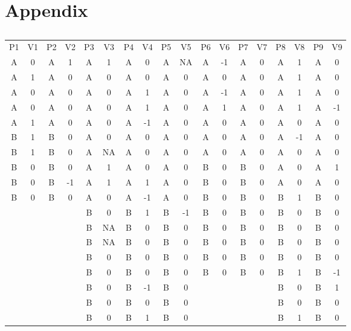 \documentclass{jote-article}
\begin{document}
\section{Appendix} 


  \begin{table}

  \label{Table 2}\caption{}
  \begin{tabular}{c  c  c  c  c  c  c  c  c  c  c  c  c  c  c  c  c  c}

  P1 & V1 & P2 & V2 & P3 & V3 & P4 & V4 & P5 & V5 & P6 & V6 & P7 & V7 & P8 & V8 & P9 & V9 & \\
A & 0 & A & 1 & A & 1 & A & 0 & A & NA & A & -1 & A & 0 & A & 1 & A & 0 & \\
A & 1 & A & 0 & A & 0 & A & 0 & A & 0 & A & 0 & A & 0 & A & 1 & A & 0 & \\
A & 0 & A & 0 & A & 0 & A & 1 & A & 0 & A & -1 & A & 0 & A & 1 & A & 0 & \\
A & 0 & A & 0 & A & 0 & A & 1 & A & 0 & A & 1 & A & 0 & A & 1 & A & -1 & \\
A & 1 & A & 0 & A & 0 & A & -1 & A & 0 & A & 0 & A & 0 & A & 0 & A & 0 & \\
B & 1 & B & 0 & A & 0 & A & 0 & A & 0 & A & 0 & A & 0 & A & -1 & A & 0 & \\
B & 1 & B & 0 & A & NA & A & 0 & A & 0 & A & 0 & A & 0 & A & 0 & A & 0 & \\
B & 0 & B & 0 & A & 1 & A & 0 & A & 0 & B & 0 & B & 0 & A & 0 & A & 1 & \\
B & 0 & B & -1 & A & 1 & A & 1 & A & 0 & B & 0 & B & 0 & A & 0 & A & 0 & \\
B & 0 & B & 0 & A & 0 & A & -1 & A & 0 & B & 0 & B & 0 & B & 1 & B & 0 & \\
 &  &  &  & B & 0 & B & 1 & B & -1 & B & 0 & B & 0 & B & 0 & B & 0 & \\
 &  &  &  & B & NA & B & 0 & B & 0 & B & 0 & B & 0 & B & 0 & B & 0 & \\
 &  &  &  & B & NA & B & 0 & B & 0 & B & 0 & B & 0 & B & 0 & B & 0 & \\
 &  &  &  & B & 0 & B & 0 & B & 0 & B & 0 & B & 0 & B & 0 & B & 0 & \\
 &  &  &  & B & 0 & B & 0 & B & 0 & B & 0 & B & 0 & B & 1 & B & -1 & \\
 &  &  &  & B & 0 & B & -1 & B & 0 &  &  &  &  & B & 0 & B & 1 & \\
 &  &  &  & B & 0 & B & 0 & B & 0 &  &  &  &  & B & 0 & B & 0 & \\
 &  &  &  & B & 0 & B & 1 & B & 0 &  &  &  &  & B & 1 & B & 0 & \\

\end{tabular}
\end{table}
\end{document}
